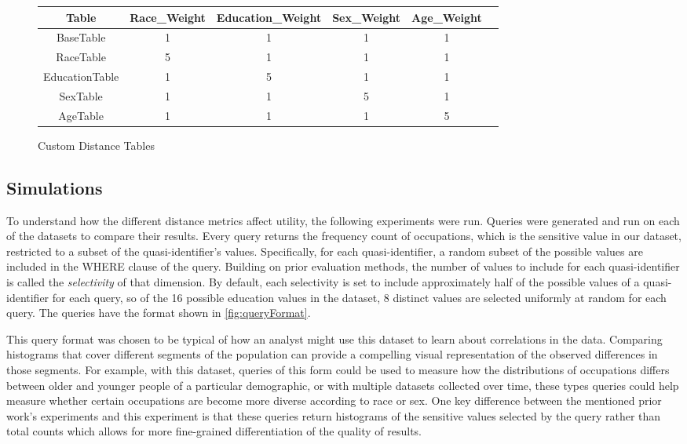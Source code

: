 \begin{figure*}
\centering
\begin{tabular}{|c||c|c|c|c|c|}
\hline
Table & Race\_Weight & Education\_Weight & Sex\_Weight & Age\_Weight \\
\hline
\hline
BaseTable & 1 & 1 & 1 & 1 \\
\hline
RaceTable & 5 & 1 & 1 & 1  \\
\hline
EducationTable & 1 & 5 & 1 & 1  \\
\hline
SexTable & 1 & 1 & 5 & 1  \\
\hline
AgeTable & 1 & 1 & 1 & 5  \\
\hline
\end{tabular}
\caption{Custom Distance Tables}
\label{fig:customeDistanceTables}
\end{figure*}

\subsection{Simulations}
To understand how the different distance metrics affect utility, the following experiments were run. Queries were generated and run on each of the datasets to compare their results. Every query returns the frequency count of occupations, which is the sensitive value in our dataset, restricted to a subset of the quasi-identifier's values. Specifically, for each quasi-identifier, a random subset of the possible values are included in the WHERE clause of the query. Building on prior evaluation methods\cite{xiaoAnatomy}, the number of values to include for each quasi-identifier is called the \emph{selectivity} of that dimension. By default, each selectivity is set to include approximately half of the possible values of a quasi-identifier for each query, so of the 16 possible education values in the dataset, 8 distinct values are selected uniformly at random for each query. The queries have the format shown in \ref{fig:queryFormat}.

This query format was chosen to be typical of how an analyst might use this dataset to learn about correlations in the data. Comparing histograms that cover different segments of the population can provide a compelling visual representation of the observed differences in those segments. For example, with this dataset, queries of this form could be used to measure how the distributions of occupations differs between older and younger people of a particular demographic, or with multiple datasets collected over time, these types queries could help measure whether certain occupations are become more diverse according to race or sex. One key difference between the mentioned prior work's experiments\cite{xiaoAnatomy} and this experiment is that these queries return histograms of the sensitive values selected by the query rather than total counts which allows for more fine-grained differentiation of the quality of results.

